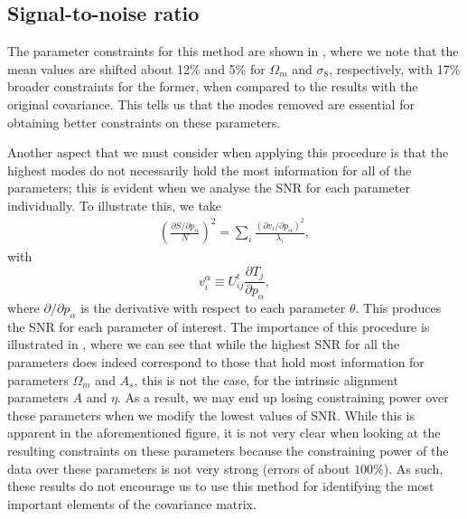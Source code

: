 \documentclass[twocolumn]{\docclass}
\newcommand\be{\begin{equation}}
\newcommand\ee{\end{equation}}
\def\bea{\begin{eqnarray}}
\def\eea{\end{eqnarray}}
\begin{document}
	
	
	
	\subsection{Signal-to-noise ratio}
	
	The parameter constraints for this method are shown in , where we note that the mean values are shifted about 12\% and 5\% for $\Omega_m$ and $\sigma_8$, respectively, with 17\% broader constraints for the former, when compared to the results with the original covariance. This tells us that the modes removed are essential for obtaining better constraints on these parameters. 
	
	Another aspect that we must consider when applying this procedure is that the highest modes do not necessarily hold the most information for all of the parameters; this is evident when we analyse the SNR for each parameter individually. To illustrate this, we take
	\bea
	\left(\frac{\partial S/\partial p_\alpha}{N}\right)^2 = \sum_{i} \frac{(\partial v_i / \partial p_\alpha)^2}{\lambda_i}
	,\eea
	with
	\be
	v_i^\alpha \equiv U_{ij}^t \frac{\partial T_j}{\partial p_\alpha}
	,\ee
	where $\partial /\partial p_\alpha$ is the derivative with respect to each parameter $\theta$. This produces the SNR for each parameter of interest. The importance of this procedure is illustrated in , where we can see that while the highest SNR for all the parameters does indeed correspond to those that hold most information for parameters $\Omega_m$ and $A_s$, this is not the case, for the intrinsic alignment parameters $A$ and $\eta$. As a result, we may end up losing constraining power over these parameters when we modify the lowest values of SNR. While this is apparent in the aforementioned figure, it is not very clear when looking at the resulting constraints on these parameters because the constraining power of the data over these parameters is not very strong (errors of about $100 \%$). As such, these results do not encourage us to use this method for identifying the most important elements of the covariance matrix.
	
\end{document}
